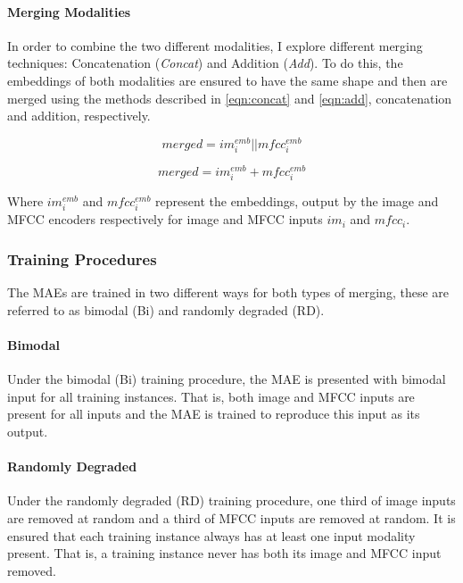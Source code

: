 \paragraph{Merging Modalities}
In order to combine the two different modalities, I explore different merging techniques: Concatenation (\textit{Concat}) and Addition (\textit{Add}). To do this, the embeddings of both modalities are ensured to have the same shape and then are merged using the methods described in \autoref{eqn:concat} and \autoref{eqn:add}, concatenation and addition, respectively. %

 \begin{equation}
 	merged = im_i^{emb} || mfcc_i^{emb}
 	\label{eqn:concat}
 \end{equation}

 \begin{equation}
 	merged = im_i^{emb} + mfcc_i^{emb}
 	\label{eqn:add}  
 \end{equation}
 

Where $im_i^{emb}$ and $mfcc_i^{emb}$ represent the embeddings, output by the image and MFCC encoders respectively for image and MFCC inputs $im_i$ and $mfcc_i$.

\subsubsection{Training Procedures}

The MAEs are trained in two different ways for both types of merging, these are referred to as bimodal (Bi) and randomly degraded (RD).

\paragraph{Bimodal}
Under the bimodal (Bi) training procedure, the MAE is presented with bimodal input for all training instances. That is, both image and MFCC inputs are present for all inputs and the MAE is trained to reproduce this input as its output.

\paragraph{Randomly Degraded}
Under the randomly degraded (RD) training procedure, one third of image inputs are removed at random and a third of MFCC inputs are removed at random. It is ensured that each training instance always has at least one input modality present. That is, a training instance never has both its image and MFCC input removed. 

